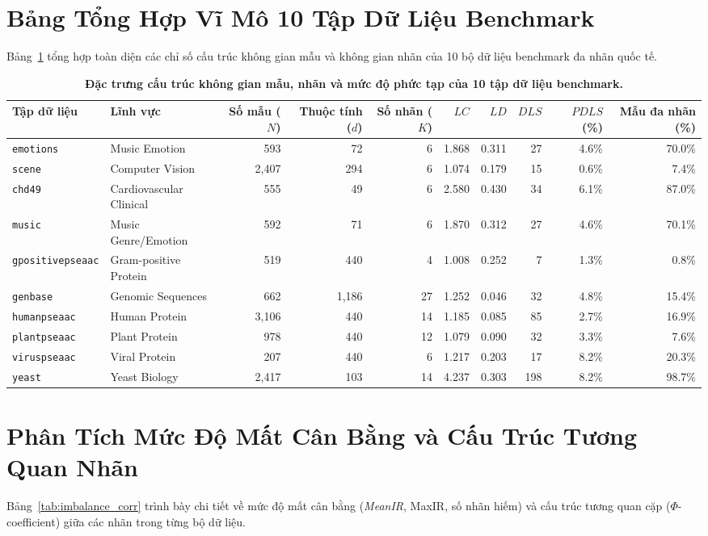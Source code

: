 \documentclass[11pt,a4paper]{article}
\begin{document}
\section{Bảng Tổng Hợp Vĩ Mô 10 Tập Dữ Liệu Benchmark}
Bảng~\ref{tab:dataset_macro} tổng hợp toàn diện các chỉ số cấu trúc không gian mẫu và không gian nhãn của 10 bộ dữ liệu benchmark đa nhãn quốc tế.

\begin{table}[htbp]
\centering
\small
\caption{\textbf{Đặc trưng cấu trúc không gian mẫu, nhãn và mức độ phức tạp của 10 tập dữ liệu benchmark.}}
\label{tab:dataset_macro}
\begin{tabularx}{\textwidth}{l l r r r r r r r r}
\toprule
\textbf{Tập dữ liệu} & \textbf{Lĩnh vực} & \textbf{Số mẫu ($N$)} & \textbf{Thuộc tính ($d$)} & \textbf{Số nhãn ($K$)} & \textbf{$LC$} & \textbf{$LD$} & \textbf{$DLS$} & \textbf{$PDLS$ (\%)} & \textbf{Mẫu đa nhãn (\%)} \\
\midrule
\texttt{emotions} & Music Emotion & 593 & 72 & 6 & 1.868 & 0.311 & 27 & 4.6\% & 70.0\% \\
\texttt{scene} & Computer Vision & 2,407 & 294 & 6 & 1.074 & 0.179 & 15 & 0.6\% & 7.4\% \\
\texttt{chd49} & Cardiovascular Clinical & 555 & 49 & 6 & 2.580 & 0.430 & 34 & 6.1\% & 87.0\% \\
\texttt{music} & Music Genre/Emotion & 592 & 71 & 6 & 1.870 & 0.312 & 27 & 4.6\% & 70.1\% \\
\texttt{gpositivepseaac} & Gram-positive Protein & 519 & 440 & 4 & 1.008 & 0.252 & 7 & 1.3\% & 0.8\% \\
\texttt{genbase} & Genomic Sequences & 662 & 1,186 & 27 & 1.252 & 0.046 & 32 & 4.8\% & 15.4\% \\
\texttt{humanpseaac} & Human Protein & 3,106 & 440 & 14 & 1.185 & 0.085 & 85 & 2.7\% & 16.9\% \\
\texttt{plantpseaac} & Plant Protein & 978 & 440 & 12 & 1.079 & 0.090 & 32 & 3.3\% & 7.6\% \\
\texttt{viruspseaac} & Viral Protein & 207 & 440 & 6 & 1.217 & 0.203 & 17 & 8.2\% & 20.3\% \\
\texttt{yeast} & Yeast Biology & 2,417 & 103 & 14 & 4.237 & 0.303 & 198 & 8.2\% & 98.7\% \\
\bottomrule
\end{tabularx}
\end{table}

\section{Phân Tích Mức Độ Mất Cân Bằng và Cấu Trúc Tương Quan Nhãn}
Bảng~\ref{tab:imbalance_corr} trình bày chi tiết về mức độ mất cân bằng (\textit{MeanIR}, MaxIR, số nhãn hiếm) và cấu trúc tương quan cặp ($\Phi$-coefficient) giữa các nhãn trong từng bộ dữ liệu.
\end{document}
